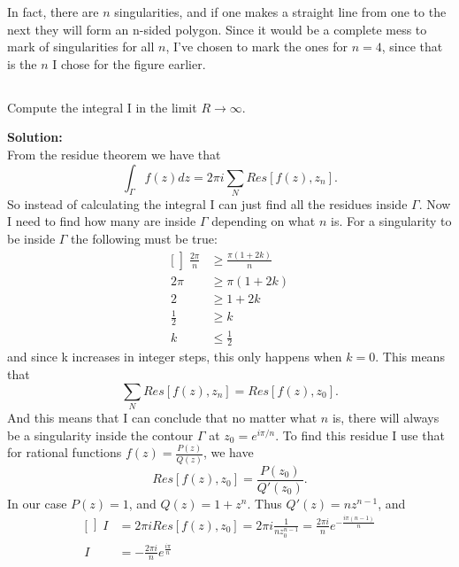 \documentclass[a4paper,12pt]{article}
\begin{document}
In fact, there are $n$ singularities, and if one makes a straight line from one to the next they will form an n-sided polygon. Since it would be a complete mess to mark of singularities for all $n$, I've chosen to mark the ones for $n=4$, since that is the $n$ I chose for the figure earlier.

\subsection{}
Compute the integral I in the limit $R \rightarrow \infty$.

\textbf{Solution:}\\
From the residue theorem we have that
\begin{equation}
 \int_\Gamma f(z)dz = 2\pi i\sum_N Res[f(z),z_n].
\end{equation}
So instead of calculating the integral I can just find all the residues inside $\Gamma$. Now I need to find how many are inside $\Gamma$ depending on what $n$ is.
For a singularity to be inside $\Gamma$ the following must be true:
\begin{equation*}
 \begin{aligned}[\left]
  \frac{2\pi}{n} &\ge \frac{\pi(1+2k)}{n}\\
  2\pi &\ge \pi(1+2k)\\
  2 &\ge 1+2k\\
  \frac{1}{2} &\ge k\\
  k &\le \frac{1}{2} 
 \end{aligned}
\end{equation*}
and since k increases in integer steps, this only happens when $k = 0$.
This means that 
$$\sum_N Res[f(z),z_n] = Res[f(z),z_0].$$
And this means that I can conclude that no matter what $n$ is, there will always be a singularity inside the contour $\Gamma$ at $z_0 = e^{i\pi/n}$.
To find this residue I use that for rational functions $f(z) = \frac{P(z)}{Q(z)}$, we have 
\begin{equation}
Res[f(z),z_0] = \frac{P(z_0)}{Q'(z_0)}. 
\end{equation}
In our case $P(z) = 1$, and $Q(z) = 1+z^n$. Thus $Q'(z) = nz^{n-1}$, and 
\begin{equation*}
\begin{aligned}[\left]
I &= 2\pi i Res[f(z),z_0] = 2\pi i\frac{1}{nz_0^{n-1}} = \frac{2\pi i}{n}e^{-\frac{i\pi(n-1)}{n}}\\
I &= -\frac{2\pi i}{n}e^{\frac{i\pi}{n}}
\end{aligned}
\end{equation*}
\end{document}
